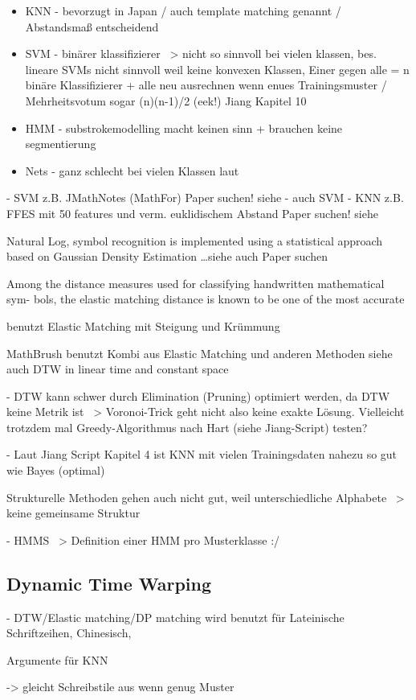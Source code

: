 \begin{itemize}
  \item KNN - bevorzugt in Japan \cite{Jaeger:2003p1097} / auch template matching genannt / Abstandsmaß entscheidend
  \item SVM - binärer klassifizierer ~> nicht so sinnvoll bei vielen klassen, bes. lineare SVMs nicht sinnvoll weil keine konvexen Klassen, Einer gegen alle = n binäre Klassifizierer + alle neu ausrechnen wenn enues Trainingsmuster / Mehrheitsvotum sogar (n)(n-1)/2 (eek!) Jiang Kapitel 10
  \item HMM - substrokemodelling macht keinen sinn + brauchen keine segmentierung
  \item Nets - ganz schlecht bei vielen Klassen laut \cite{Jaeger:2003p1097}
\end{itemize}
- SVM z.B. JMathNotes (MathFor) \TODO Paper suchen! siehe \cite{Vuong:2010p10279} - auch SVM \cite{Golubitsky:2009p2456}
- KNN z.B. FFES mit 50 features und verm. euklidischem Abstand \TODO Paper suchen! siehe \cite{Vuong:2010p10279}

Natural Log, symbol recognition is implemented using a statistical approach based on Gaussian Density Estimation \dots siehe auch \cite{Vuong:2010p10279} \TODO Paper suchen

Among the distance measures used for classifying handwritten mathematical sym- bols, the elastic matching distance is known to be one of the most accurate \cite{Golubitsky:2009p2433}
 
\cite{Vuong:2010p10279} benutzt Elastic Matching mit Steigung und Krümmung

MathBrush \cite{Labahn:2008p10301} benutzt Kombi aus Elastic Matching und anderen Methoden siehe auch \cite{MacLean:2010p9970} DTW in linear time and constant space

- DTW kann schwer durch Elimination (Pruning) optimiert werden, da DTW keine Metrik ist ~> Voronoi-Trick geht nicht also keine exakte Lösung. Vielleicht trotzdem mal Greedy-Algorithmus nach Hart (siehe Jiang-Script) testen?

- Laut Jiang Script Kapitel 4 ist KNN mit vielen Trainingsdaten nahezu so gut wie Bayes (optimal)

Strukturelle Methoden gehen auch nicht gut, weil unterschiedliche Alphabete ~> keine gemeinsame Struktur

- HMMS ~> Definition einer HMM pro Musterklasse :/
\subsection[DTW]{Dynamic Time Warping}
\label{sub:dtw}

- DTW/Elastic matching/DP matching wird benutzt für Lateinische Schriftzeihen, Chinesisch, \cite{Tappert:1990p10302}


Argumente für KNN

-> gleicht Schreibstile aus wenn genug Muster

